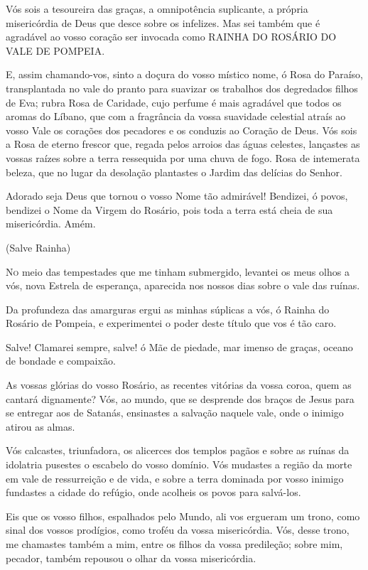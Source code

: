 \documentclass[10pt,twoside,a5paper]{article}
\begin{document}
	Vós sois a tesoureira das graças, a omnipotência suplicante, a própria misericórdia de Deus que desce sobre os infelizes. Mas sei também que é agradável ao vosso coração ser invocada como RAINHA DO ROSÁRIO DO VALE DE POMPEIA.
	
	E, assim chamando-vos, sinto a doçura do vosso místico nome, ó Rosa do Paraíso, transplantada no vale do pranto para suavizar os trabalhos dos degredados filhos de Eva; rubra Rosa de Caridade, cujo perfume é mais agradável que todos os aromas do Líbano, que com a fragrância da vossa suavidade celestial atraís ao vosso Vale os corações dos pecadores e os conduzis ao Coração de Deus. Vós sois a Rosa de eterno frescor que, regada pelos arroios das águas celestes, lançastes as vossas raízes sobre a terra ressequida por uma chuva de fogo. Rosa de intemerata beleza, que no lugar da desolação plantastes o Jardim das delícias do Senhor.
	
	Adorado seja Deus que tornou o vosso Nome tão admirável! Bendizei, ó povos, bendizei o Nome da Virgem do Rosário, pois toda a terra está cheia de sua misericórdia. Amém.
	
	(Salve Rainha)
	
 	\lettrine{N}{o} meio das tempestades que me tinham submergido, levantei os meus olhos a vós, nova Estrela de esperança, aparecida nos nossos dias sobre o vale das ruínas.
	
	Da profundeza das amarguras ergui as minhas súplicas a vós, ó Rainha do Rosário de Pompeia, e experimentei o poder deste título que vos é tão caro.
	
	Salve! Clamarei sempre, salve! ó Mãe de piedade, mar imenso de graças, oceano de bondade e compaixão.
	
	As vossas glórias do vosso Rosário, as recentes vitórias da vossa coroa, quem as cantará dignamente? Vós, ao mundo, que se desprende dos braços de Jesus para se entregar aos de Satanás, ensinastes a salvação naquele vale, onde o inimigo atirou as almas.
	
	Vós calcastes, triunfadora, os alicerces dos templos pagãos e sobre as ruínas da idolatria pusestes o escabelo do vosso domínio. Vós mudastes a região da morte em vale de ressurreição e de vida, e sobre a terra dominada por vosso inimigo fundastes a cidade do refúgio, onde acolheis os povos para salvá-los.
	
	Eis que os vosso filhos, espalhados pelo Mundo, ali vos ergueram um trono, como sinal dos vossos prodígios, como troféu da vossa misericórdia. Vós, desse trono, me chamastes também a mim, entre os filhos da vossa predileção; sobre mim, pecador, também repousou o olhar da vossa misericórdia.
	
\end{document}
